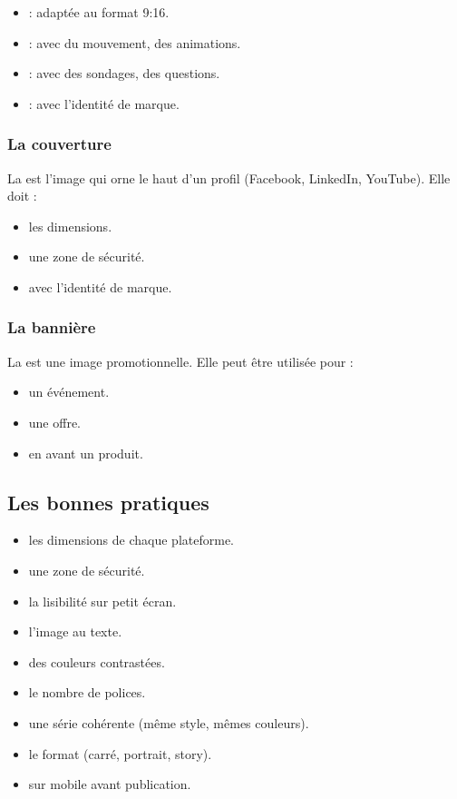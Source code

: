 \begin{itemize}
    \item {} : adaptée au format 9:16.
    \item {} : avec du mouvement, des animations.
    \item {} : avec des sondages, des questions.
    \item {} : avec l'identité de marque.
\end{itemize}

\subsubsection{La couverture}

La  est l'image qui orne le haut d'un profil (Facebook, LinkedIn, YouTube). Elle doit :

\begin{itemize}
    \item {} les dimensions.
    \item {} une zone de sécurité.
    \item {} avec l'identité de marque.
\end{itemize}

\subsubsection{La bannière}

La  est une image promotionnelle. Elle peut être utilisée pour :

\begin{itemize}
    \item {} un événement.
    \item {} une offre.
    \item {} en avant un produit.
\end{itemize}

\subsection{Les bonnes pratiques}

\begin{itemize}
    \item {} les dimensions de chaque plateforme.
    \item {} une zone de sécurité.
    \item {} la lisibilité sur petit écran.
    \item {} l'image au texte.
    \item {} des couleurs contrastées.
    \item {} le nombre de polices.
    \item {} une série cohérente (même style, mêmes couleurs).
    \item {} le format (carré, portrait, story).
    \item {} sur mobile avant publication.
\end{itemize}

